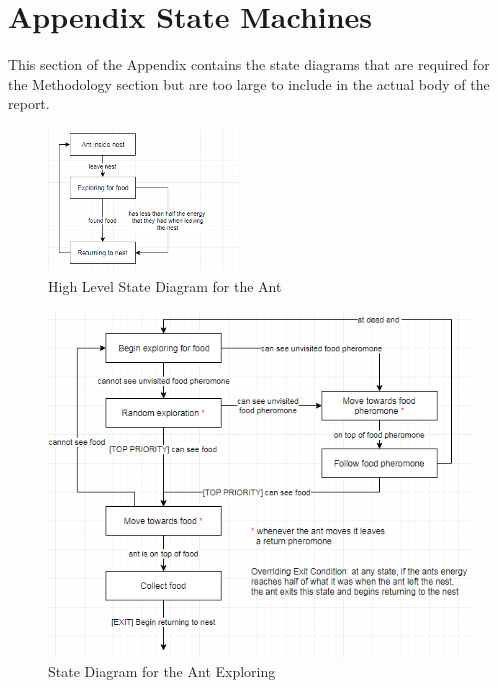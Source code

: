 \section{Appendix State Machines}

This section of the Appendix contains the state diagrams that are required for the Methodology section but are too large to include in the actual body of the report. 

 \begin{figure}[H]
  \centering
  \includegraphics[width=0.45\textwidth]{images/top-level.png}
  \caption{High Level State Diagram for the Ant}
  \label{fig:ant-highlvl}
\end{figure}

\begin{figure}[H]
  \centering
  \includegraphics[width=1\textwidth]{images/exploring.png}
  \caption{State Diagram for the Ant Exploring}
  \label{fig:ant-exploring}
\end{figure}

